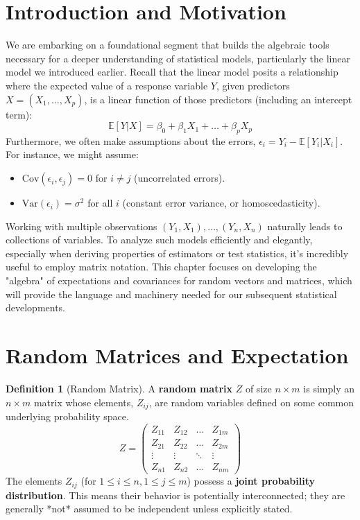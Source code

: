 \documentclass[11pt]{article}
\theoremstyle{definition}
\newtheorem{definition}[theorem]{Definition}
\newcommand{\E}{\mathbb{E}}
\newcommand{\Cov}{\mathrm{Cov}}
\newcommand{\Var}{\mathrm{Var}}
\begin{document}
\vspace{2ex} %

\section{Introduction and Motivation}

We are embarking on a foundational segment that builds the algebraic tools necessary for a deeper understanding of statistical models, particularly the linear model we introduced earlier. Recall that the linear model posits a relationship where the expected value of a response variable $Y$, given predictors $X = (X_1, \dots, X_p)$, is a linear function of those predictors (including an intercept term):
\[ \E[Y | X] = \beta_0 + \beta_1 X_1 + \dots + \beta_p X_p \]
Furthermore, we often make assumptions about the errors, $\epsilon_i = Y_i - \E[Y_i | X_i]$. For instance, we might assume:
\begin{itemize}
    \item $\Cov(\epsilon_i, \epsilon_j) = 0$ for $i \neq j$ (uncorrelated errors).
    \item $\Var(\epsilon_i) = \sigma^2$ for all $i$ (constant error variance, or homoscedasticity).
\end{itemize}
Working with multiple observations $(Y_1, X_1), \dots, (Y_n, X_n)$ naturally leads to collections of variables. To analyze such models efficiently and elegantly, especially when deriving properties of estimators or test statistics, it's incredibly useful to employ matrix notation. This chapter focuses on developing the "algebra" of expectations and covariances for random vectors and matrices, which will provide the language and machinery needed for our subsequent statistical developments.

\section{Random Matrices and Expectation}

\begin{definition}[Random Matrix]
A \textbf{random matrix} $Z$ of size $n \times m$ is simply an $n \times m$ matrix whose elements, $Z_{ij}$, are random variables defined on some common underlying probability space.
\[ Z = \begin{pmatrix} Z_{11} & Z_{12} & \dots & Z_{1m} \\ Z_{21} & Z_{22} & \dots & Z_{2m} \\ \vdots & \vdots & \ddots & \vdots \\ Z_{n1} & Z_{n2} & \dots & Z_{nm} \end{pmatrix} \]
The elements $Z_{ij}$ (for $1 \le i \le n, 1 \le j \le m$) possess a \textbf{joint probability distribution}. This means their behavior is potentially interconnected; they are generally *not* assumed to be independent unless explicitly stated.
\end{definition}
\end{document}
